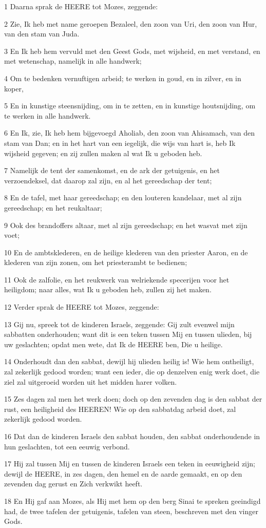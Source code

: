 \par 1 Daarna sprak de HEERE tot Mozes, zeggende:
\par 2 Zie, Ik heb met name geroepen Bezaleel, den zoon van Uri, den zoon van Hur, van den stam van Juda.
\par 3 En Ik heb hem vervuld met den Geest Gods, met wijsheid, en met verstand, en met wetenschap, namelijk in alle handwerk;
\par 4 Om te bedenken vernuftigen arbeid; te werken in goud, en in zilver, en in koper,
\par 5 En in kunstige steensnijding, om in te zetten, en in kunstige houtsnijding, om te werken in alle handwerk.
\par 6 En Ik, zie, Ik heb hem bijgevoegd Aholiab, den zoon van Ahisamach, van den stam van Dan; en in het hart van een iegelijk, die wijs van hart is, heb Ik wijsheid gegeven; en zij zullen maken al wat Ik u geboden heb.
\par 7 Namelijk de tent der samenkomst, en de ark der getuigenis, en het verzoendeksel, dat daarop zal zijn, en al het gereedschap der tent;
\par 8 En de tafel, met haar gereedschap; en den louteren kandelaar, met al zijn gereedschap; en het reukaltaar;
\par 9 Ook des brandoffers altaar, met al zijn gereedschap; en het wasvat met zijn voet;
\par 10 En de ambtsklederen, en de heilige klederen van den priester Aaron, en de klederen van zijn zonen, om het priesterambt te bedienen;
\par 11 Ook de zalfolie, en het reukwerk van welriekende specerijen voor het heiligdom; naar alles, wat Ik u geboden heb, zullen zij het maken.
\par 12 Verder sprak de HEERE tot Mozes, zeggende:
\par 13 Gij nu, spreek tot de kinderen Israels, zeggende: Gij zult evenwel mijn sabbatten onderhouden; want dit is een teken tussen Mij en tussen ulieden, bij uw geslachten; opdat men wete, dat Ik de HEERE ben, Die u heilige.
\par 14 Onderhoudt dan den sabbat, dewijl hij ulieden heilig is! Wie hem ontheiligt, zal zekerlijk gedood worden; want een ieder, die op denzelven enig werk doet, die ziel zal uitgeroeid worden uit het midden harer volken.
\par 15 Zes dagen zal men het werk doen; doch op den zevenden dag is den sabbat der rust, een heiligheid des HEEREN! Wie op den sabbatdag arbeid doet, zal zekerlijk gedood worden.
\par 16 Dat dan de kinderen Israels den sabbat houden, den sabbat onderhoudende in hun geslachten, tot een eeuwig verbond.
\par 17 Hij zal tussen Mij en tussen de kinderen Israels een teken in eeuwigheid zijn; dewijl de HEERE, in zes dagen, den hemel en de aarde gemaakt, en op den zevenden dag gerust en Zich verkwikt heeft.
\par 18 En Hij gaf aan Mozes, als Hij met hem op den berg Sinai te spreken geeindigd had, de twee tafelen der getuigenis, tafelen van steen, beschreven met den vinger Gods.

